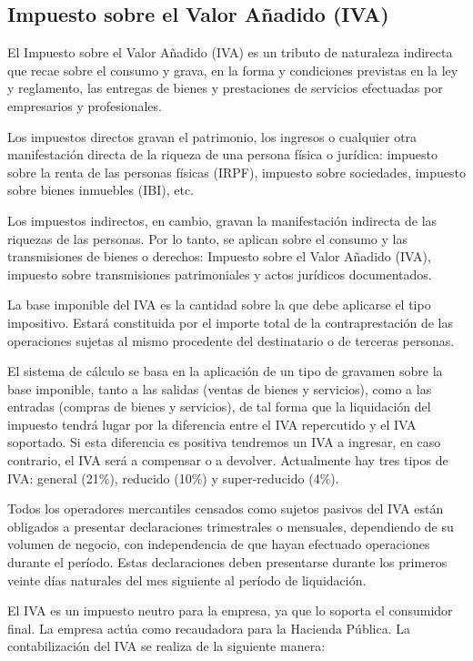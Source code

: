 \documentclass{article}
\begin{document}
\subsection{Impuesto sobre el Valor Añadido (IVA)}

El Impuesto sobre el Valor Añadido (IVA) es un tributo de naturaleza indirecta que recae sobre el consumo y grava, en la forma y condiciones previstas en la ley y reglamento, las entregas de bienes y prestaciones de servicios efectuadas por empresarios y profesionales.

Los impuestos directos gravan el patrimonio, los ingresos o cualquier otra manifestación directa de la riqueza de una persona física o jurídica: impuesto sobre la renta de las personas físicas (IRPF), impuesto sobre sociedades, impuesto sobre bienes inmuebles (IBI), etc.

Los impuestos indirectos, en cambio, gravan la manifestación indirecta de las riquezas de las personas. Por lo tanto, se aplican sobre el consumo y las transmisiones de bienes o derechos: Impuesto sobre el Valor Añadido (IVA), impuesto sobre transmisiones patrimoniales y actos jurídicos documentados.

La base imponible del IVA es la cantidad sobre la que debe aplicarse el tipo impositivo. Estará constituida por el importe total de la contraprestación de las operaciones sujetas al mismo procedente del destinatario o de terceras personas.

El sistema de cálculo se basa en la aplicación de un tipo de gravamen sobre la base imponible, tanto a las salidas (ventas de bienes y servicios), como a las entradas (compras de bienes y servicios), de tal forma que la liquidación del impuesto tendrá lugar por la diferencia entre el IVA repercutido y el IVA soportado. Si esta diferencia es positiva tendremos un IVA a ingresar, en caso contrario, el IVA será a compensar o a devolver. Actualmente hay tres tipos de IVA: general (21\%), reducido (10\%) y super-reducido (4\%).

Todos los operadores mercantiles censados como sujetos pasivos del IVA están obligados a presentar declaraciones trimestrales o mensuales, dependiendo de su volumen de negocio, con independencia de que hayan efectuado operaciones durante el período. Estas declaraciones deben presentarse durante los primeros veinte días naturales del mes siguiente al período de liquidación.

El IVA es un impuesto neutro para la empresa, ya que lo soporta el consumidor final. La empresa actúa como recaudadora para la Hacienda Pública. La contabilización del IVA se realiza de la siguiente manera:
\end{document}
